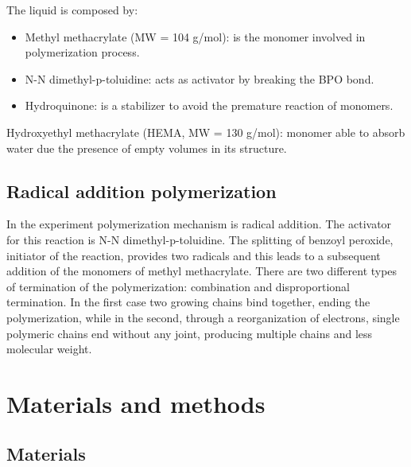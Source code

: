 \documentclass[a4paper, 11pt]{article}
\begin{document}
\newpage

The liquid is composed by:
\begin{itemize}
\item Methyl methacrylate (MW = 104 g/mol): is the monomer involved in polymerization process. 
\begin{figure}[h!]
\centering
{} 
\end{figure}
\item N-N dimethyl-p-toluidine: acts as activator by breaking the BPO bond.
\item Hydroquinone: is a stabilizer to avoid the premature reaction of monomers.
\end{itemize}
Hydroxyethyl methacrylate (HEMA, MW = 130 g/mol): monomer able to absorb water due the presence of empty volumes in its structure. 
\begin{figure}[h]
\centering
{} 
\end{figure}

\subsection{Radical addition polymerization}

In the experiment polymerization mechanism is radical addition. The activator for this reaction is N-N dimethyl-p-toluidine. The splitting of benzoyl peroxide, initiator of the reaction, provides two radicals and this leads to a subsequent addition of the monomers of methyl methacrylate. There are two different types of termination of the polymerization: combination and disproportional termination. In the first case two growing chains bind together, ending the polymerization, while in the second, through a reorganization of electrons, single polymeric chains end without any joint, producing multiple chains and less molecular weight.

\newpage

\section{Materials and methods}

\subsection{Materials}
\end{document}
